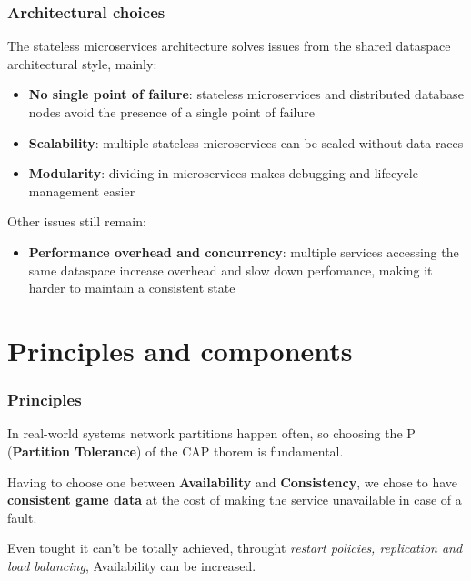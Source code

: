 \documentclass{beamer}
\begin{document}
\begin{frame}
\frametitle{Architectural choices}
The stateless microservices architecture solves issues from the shared dataspace architectural style, mainly:
\begin{itemize}
    \item {\color{ForestGreen}\textbf{No single point of failure}}: stateless microservices and distributed database nodes
        avoid the presence of a single point of failure
    \item {\color{ForestGreen}\textbf{Scalability}}: multiple stateless microservices can be scaled without data races
    \item {\color{ForestGreen}\textbf{Modularity}}: dividing in microservices makes debugging and lifecycle management easier 
\end{itemize}
Other issues still remain:
\begin{itemize}
    \item {\color{Bittersweet}\textbf{Performance overhead and concurrency}}: multiple services accessing the same 
        dataspace increase overhead and slow down perfomance, making it harder to maintain a consistent state
\end{itemize}





\end{frame}

\section{Principles and components}\label{sec:principles}

\begin{frame}
\frametitle{Principles}
In real-world systems network partitions happen often, so choosing the P (\textbf{\color{ForestGreen}Partition Tolerance}) of the CAP 
thorem is fundamental.

Having to choose one between \textbf{Availability} and \textbf{Consistency}, we chose to have \textbf{\color{ForestGreen}consistent game data} at the cost
of making the service unavailable in case of a fault.

Even tought {\color{Bittersweet}it can't be totally achieved}, throught \textit{restart policies, replication and load balancing},
{\color{Bittersweet}Availability} can be increased. 
\end{frame}
\end{document}
